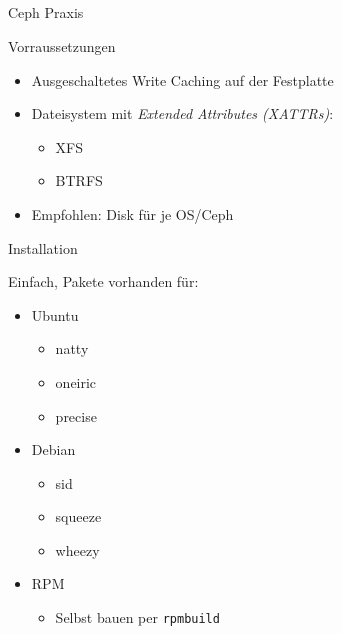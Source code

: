 \documentclass[notes=hide,yellow]{beamer}
\begin{document}
\subsection*{}

\begin{frame}
	\begin{center}
	\Large{Ceph Praxis}
	\end{center}
\end{frame}


\begin{frame}{Vorraussetzungen}
	\begin{itemize}
		\item Ausgeschaltetes Write Caching auf der Festplatte
		\item Dateisystem mit \emph{Extended Attributes (XATTRs)}:
		\begin{itemize}
			\item XFS
			\item BTRFS
		\end{itemize}
		\item Empfohlen: Disk f\"ur je OS/Ceph

	\end{itemize}
\end{frame}



\begin{frame}{Installation}

	Einfach, Pakete vorhanden f\"ur:
	\begin{itemize}
		\item Ubuntu
		\begin{itemize}
			\item natty
			\item oneiric
			\item precise
		\end{itemize}
		\item Debian
		\begin{itemize}
			\item sid
			\item squeeze
			\item wheezy
		\end{itemize}
		\item RPM 
		\begin{itemize}
			\item Selbst bauen per \texttt{rpmbuild}
		\end{itemize}
	\end{itemize}

\end{frame}
\end{document}
